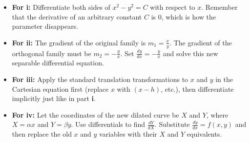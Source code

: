 \begin{hint}
\begin{itemize}
    \item \textbf{For i:} Differentiate both sides of $x^2 - y^2 = C$ with respect to $x$. Remember that the derivative of an arbitrary constant $C$ is $0$, which is how the parameter disappears.
    \item \textbf{For ii:} The gradient of the original family is $m_1 = \frac{x}{y}$. The gradient of the orthogonal family must be $m_2 = -\frac{y}{x}$. Set $\frac{dy}{dx} = -\frac{y}{x}$ and solve this new separable differential equation.
    \item \textbf{For iii:} Apply the standard translation transformations to $x$ and $y$ in the Cartesian equation first (replace $x$ with $(x-h)$, etc.), then differentiate implicitly just like in part \textbf{i}.
    \item \textbf{For iv:} Let the coordinates of the new dilated curve be $X$ and $Y$, where $X = \alpha x$ and $Y = \beta y$. Use differentials to find $\frac{dY}{dX}$. Substitute $\frac{dy}{dx} = f(x,y)$ and then replace the old $x$ and $y$ variables with their $X$ and $Y$ equivalents.
\end{itemize}
\end{hint}

